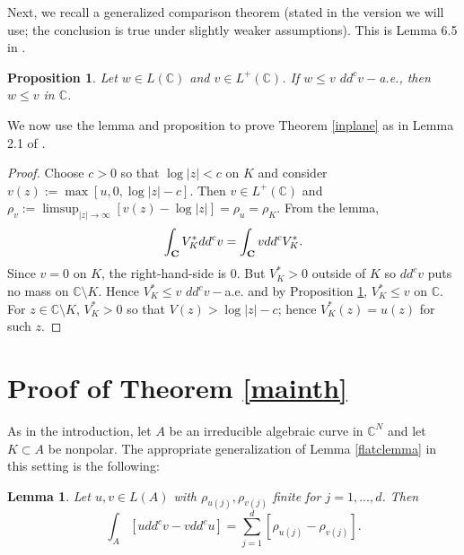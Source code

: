 \documentclass[12pt]{article}
\numberwithin{equation}{section}
\newtheorem{proposition}[theorem]{Proposition}
\newtheorem{lemma}[theorem]{Lemma}
\newcommand{\C}{\mathbb{C}}
\begin{document}
Next, we recall a generalized comparison theorem (stated in the version we will use; the conclusion is true under slightly weaker assumptions). This is Lemma 6.5 in \cite{BT}.

\begin{proposition} \label{compthm} Let $w\in L(\C)$ and $v\in L^+(\C)$. If $w\leq v$ $dd^cv-$a.e., then $w\leq v$ in $\C$. 


\end{proposition}

We now use the lemma and proposition to prove Theorem \ref{inplane} as in Lemma 2.1 of \cite{B98}.

\begin{proof} Choose $c>0$ so that $\log|z| < c$ on $K$ and consider $v(z):=\max[u,0,\log |z|-c]$. Then $v\in L^+(\C)$ and $\rho_v:=\limsup_{|z|\to \infty}[v(z)-\log |z|]=\rho_u=\rho_K$. From the lemma, 
$$\int_{\bf C} V_K^* dd^c v =  \int_{\bf C} v dd^cV_K^*.$$
Since $v=0$ on $K$, the right-hand-side is $0$. But $V_K^*>0$ outside of $K$ so $dd^c v$ puts no mass on $\C \setminus K$. Hence 
$V_K^* \leq v$ $dd^cv-$a.e. and by Proposition \ref{compthm}, $V_K^* \leq v$ on $\C$. For $z\in \C \setminus K$, $V_K^* >0$ so that 
$V(z)> \log |z| - c$; hence $V_K^*(z)=u(z)$ for such $z$.


\end{proof}

\section{Proof of Theorem \ref{mainth}} As in the introduction, let $A$ be an irreducible algebraic curve in $\C^N$ and let $K\subset A$ be nonpolar. The appropriate generalization of Lemma \ref{flatclemma} in this setting is the following:

\begin{lemma} Let $u,v\in L(A)$ with $\rho_{u(j)}, \rho_{v(j)}$ finite for $j=1,...,d$. Then 
$$\int_{A} [udd^cv-vdd^cu]= \sum_{j=1}^d [\rho_{u(j)}- \rho_{v(j)}].$$
\end{lemma}
\end{document}
